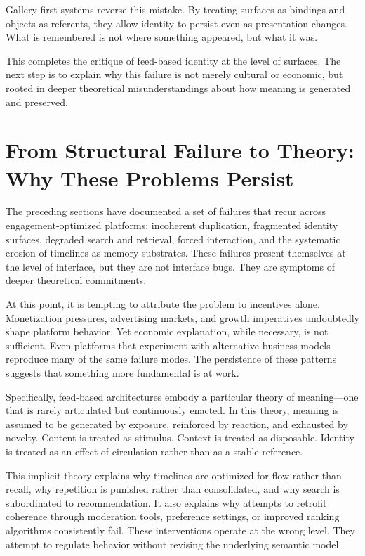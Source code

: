 \documentclass[11pt,oneside]{article}
\begin{document}
Gallery-first systems reverse this mistake. By treating surfaces as bindings and objects as referents, they allow identity to persist even as presentation changes. What is remembered is not where something appeared, but what it was.

This completes the critique of feed-based identity at the level of surfaces. The next step is to explain why this failure is not merely cultural or economic, but rooted in deeper theoretical misunderstandings about how meaning is generated and preserved.

\section{From Structural Failure to Theory: Why These Problems Persist}

The preceding sections have documented a set of failures that recur across engagement-optimized platforms: incoherent duplication, fragmented identity surfaces, degraded search and retrieval, forced interaction, and the systematic erosion of timelines as memory substrates. These failures present themselves at the level of interface, but they are not interface bugs. They are symptoms of deeper theoretical commitments.

At this point, it is tempting to attribute the problem to incentives alone. Monetization pressures, advertising markets, and growth imperatives undoubtedly shape platform behavior. Yet economic explanation, while necessary, is not sufficient. Even platforms that experiment with alternative business models reproduce many of the same failure modes. The persistence of these patterns suggests that something more fundamental is at work.

Specifically, feed-based architectures embody a particular theory of meaning—one that is rarely articulated but continuously enacted. In this theory, meaning is assumed to be generated by exposure, reinforced by reaction, and exhausted by novelty. Content is treated as stimulus. Context is treated as disposable. Identity is treated as an effect of circulation rather than as a stable reference.

This implicit theory explains why timelines are optimized for flow rather than recall, why repetition is punished rather than consolidated, and why search is subordinated to recommendation. It also explains why attempts to retrofit coherence through moderation tools, preference settings, or improved ranking algorithms consistently fail. These interventions operate at the wrong level. They attempt to regulate behavior without revising the underlying semantic model.
\end{document}
